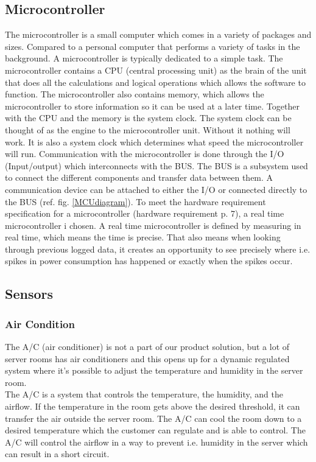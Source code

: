 \subsection{Microcontroller}
The microcontroller is a small computer which comes in a variety of packages and sizes. Compared to a personal  computer that performs a variety of tasks in the background. A microcontroller is typically dedicated to a simple task. 
\newline
The microcontroller contains a CPU (central processing unit) as the brain of the unit that does all the calculations and logical operations which allows the software to function. The microcontroller also contains memory, which allows the microcontroller to store information so it can be used at a later time. Together with the CPU and the memory is the system clock. The system clock can be thought of as the engine to the microcontroller unit. Without it nothing will work. It is also a system clock which determines what speed the microcontroller will run. 
Communication with the microcontroller is done through the I/O (Input/output) which interconnects with the BUS. The BUS is a subsystem used to connect the different components and transfer data between them. A communication device can be attached to either the I/O or connected directly to the BUS (ref. fig. \ref{MCUdiagram}). 
To meet the hardware requirement specification for a microcontroller (hardware requirement p. 7), a real time microcontroller i chosen. 
A real time microcontroller is defined by measuring in real time, which means the time is precise. That also means when looking through previous logged data, it creates an opportunity to see precisely where i.e. spikes in power consumption has happened or exactly when the spikes occur.

\subsection{Sensors}
\subsubsection{Air Condition}
The A/C (air conditioner) is not a part of our product solution, but a lot of server rooms has air conditioners and this opens up for a dynamic regulated system where it’s possible to adjust the temperature and humidity in the server room.\\
The A/C is a system that controls the temperature,  the humidity, and the airflow.
If the temperature in the room gets above the desired threshold, it can transfer the air outside the server room.
The A/C can cool the room down to a desired temperature which the customer can regulate and is able to control. The A/C will control the airflow in a way to prevent i.e. humidity in the server which can result in a short circuit.

